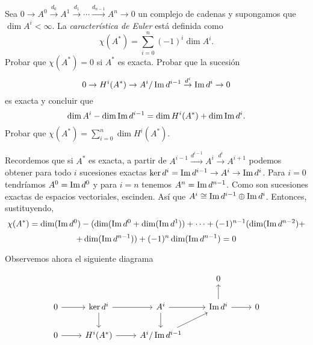 \documentclass[twoside]{article}
\begin{document}
\begin{ejercicio}{4.4}
Sea $0\to A^0\overset{d_0}{\to}A^1\overset{d_1}{\to}\cdots\overset{d_{n-1}}{\to}A^n\to 0$ un complejo de cadenas y supongamos que $\dim A^i<\infty$. La \emph{característica de Euler} está definida como
\[
\chi(A^*)=\sum_{i=0}^n (-1)^i\dim A^i.
\]
Probar que $\chi(A^*)=0$ si $A^*$ es exacta. Probar que la sucesión 
\[
0\to H^i(A^*)\to A^i/\operatorname{Im} d^{i-1}\overset{d^i}{\to}\operatorname{Im} d^i\to 0
\]
es exacta y concluir que
\[
\dim A^i-\dim\operatorname{Im} d^{i-1}=\dim H^i(A^*)+\dim\operatorname{Im} d^i.
\]
Probar que $\chi(A^*)=\sum_{i=0}^n\dim H^i(A^*)$.
\end{ejercicio}
\begin{solucion}
Recordemos que si $A^*$ es exacta, a partir de $A^{i-1}\overset{d^{i-1}}{\to} A^i\overset{d^i}{\to} A^{i+1}$ podemos obtener para todo $i$ sucesiones exactas $\ker{d^i}=\operatorname{Im}{d^{i-1}}\to A^i\to \operatorname{Im}{d^i}$. Para $i=0$ tendríamos $A^0=\operatorname{Im}{d^0}$ y para $i=n$ tenemos $A^n=\operatorname{Im}{d^{n-1}}$. Como son sucesiones exactas de espacios vectoriales, escinden. Así que $A^i\cong \operatorname{Im}{d^{i-1}}\oplus\operatorname{Im}{d^i}$. Entonces, sustituyendo,
\[
\chi(A^*)=\dim(\operatorname{Im}{d^0})-(\dim(\operatorname{Im}{d^0}+\dim(\operatorname{Im}{d^1}))+\cdots +(-1)^{n-1}(\dim(\operatorname{Im}{d^{n-2}})+
\]
\[
+\dim(\operatorname{Im}{d^{n-1}}))+(-1)^n\dim(\operatorname{Im}{d^{n-1}})=0
\]

Observemos ahora el siguiente diagrama


\[
\begin{tikzcd}[remember picture] %
 & & & 0 &  \\
0\arrow[r] & \ker{d^i}\arrow[d]\arrow[r] &
 A^i\arrow[d]\arrow[r] & \Ima {d^{i}}\arrow[r]\arrow[u] & 0\\
0 \arrow[r] &  H^i(A^*)\arrow[r] & A^i/ \Ima {d^{i-1}}\arrow[ur] & & 
\end{tikzcd}
\]


\end{solucion}
\end{document}
